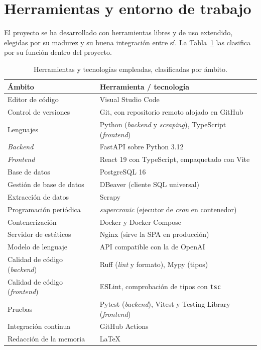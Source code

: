 \section{Herramientas y entorno de trabajo}
\label{sec:met-herramientas}

El proyecto se ha desarrollado con herramientas libres y de uso extendido,
elegidas por su madurez y su buena integración entre sí. La
Tabla~\ref{tab:herramientas} las clasifica por su función dentro del proyecto.

\begin{table}[H]
\centering
\begin{tabular}{p{4.2cm}p{8.0cm}}
\hline
\textbf{Ámbito} & \textbf{Herramienta / tecnología} \\
\hline
Editor de código & Visual Studio Code \\
Control de versiones & Git, con repositorio remoto alojado en GitHub \\
Lenguajes & Python (\emph{backend} y \emph{scraping}), TypeScript (\emph{frontend}) \\
\emph{Backend} & FastAPI sobre Python 3.12 \\
\emph{Frontend} & React 19 con TypeScript, empaquetado con Vite \\
Base de datos & PostgreSQL 16 \\
Gestión de base de datos & DBeaver (cliente SQL universal) \\
Extracción de datos & Scrapy \\
Programación periódica & \emph{supercronic} (ejecutor de \emph{cron} en contenedor) \\
Contenerización & Docker y Docker Compose \\
Servidor de estáticos & Nginx (sirve la SPA en producción) \\
Modelo de lenguaje & API compatible con la de OpenAI \\
Calidad de código (\emph{backend}) & Ruff (\emph{lint} y formato), Mypy (tipos) \\
Calidad de código (\emph{frontend}) & ESLint, comprobación de tipos con \texttt{tsc} \\
Pruebas & Pytest (\emph{backend}), Vitest y Testing Library (\emph{frontend}) \\
Integración continua & GitHub Actions \\
Redacción de la memoria & \LaTeX{} \\
\hline
\end{tabular}
\caption{Herramientas y tecnologías empleadas, clasificadas por ámbito.}
\label{tab:herramientas}
\end{table}

